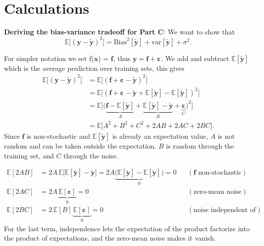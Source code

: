 \documentclass[reprint,english,notitlepage]{revtex4-2}  %
\begin{document}
\clearpage
\

\onecolumngrid
\appendix 

\section{Calculations}\label{app:calculations}
\textbf{Deriving the bias-variance tradeoff for Part C}:
We want to show that
\begin{equation*}
\mathbb{E}\big[(\mathbf{y} - \tilde{\mathbf{y}})^2\big]
= \mathrm{Bias}^2[\tilde{\mathbf{y}}] + \mathrm{var}[\tilde{\mathbf{y}}] + \sigma^2 .
\end{equation*}


For simpler notation we set f($\bm{x}$) = $\bm{f}$, thus $\mathbf{y} = \mathbf{f} + \boldsymbol{\varepsilon}$. We add and subtract $\mathbb{E}[\tilde{\mathbf{y}}]$ which is the average prediction over training sets, this gives
\begin{align*}
\mathbb{E}\big[(\mathbf{y} - \tilde{\mathbf{y}})^2\big]
&= \mathbb{E}\big[(\mathbf{f} + \boldsymbol{\varepsilon} - \tilde{\mathbf{y}})^2\big] \\
&= \mathbb{E}\big[(\mathbf{f} + \boldsymbol{\varepsilon} - \tilde{\mathbf{y}}
+ \mathbb{E}[\tilde{\mathbf{y}}] - \mathbb{E}[\tilde{\mathbf{y}}])^2\big] \\
&= \mathbb{E}\Big[\Big(\underbrace{\mathbf{f} - \mathbb{E}[\tilde{\mathbf{y}}]}_{A}
+ \underbrace{\mathbb{E}[\tilde{\mathbf{y}}] - \tilde{\mathbf{y}}}_{B}
+ \underbrace{\boldsymbol{\varepsilon}}_{C}\Big)^2\Big] \\
&= \mathbb{E}\big[A^2 + B^2 + C^2 + 2AB + 2AC + 2BC\big] .
\end{align*}
Since $\mathbf{f}$ is non-stochastic and $\mathbb{E}[\tilde{\mathbf{y}}]$ is
already an expectation value, $A$ is not random and can be taken outside the
expectation. $B$ is random through the training set, and $C$ through the noise.

\begin{align*}
\mathbb{E}[2AB] &= 2A\,\mathbb{E}\big[\mathbb{E}[\tilde{\mathbf{y}}] - \tilde{\mathbf{y}}\big]
= 2A\underbrace{\big(\mathbb{E}[\tilde{\mathbf{y}}] - \mathbb{E}[\tilde{\mathbf{y}}]\big)}_{0} = 0
&& (\mathbf{f} \text{ non-stochastic}) \\
\mathbb{E}[2AC] &= 2A\,\underbrace{\mathbb{E}[\boldsymbol{\varepsilon}]}_{0} = 0
&& (\text{zero-mean noise}) \\
\mathbb{E}[2BC] &= 2\,\mathbb{E}[B]\,\underbrace{\mathbb{E}[\boldsymbol{\varepsilon}]}_{0} = 0
&& (\text{noise independent of training set})
\end{align*}
For the last term, independence lets the expectation of the product factorize
into the product of expectations, and the zero-mean noise makes it vanish.
\end{document}
